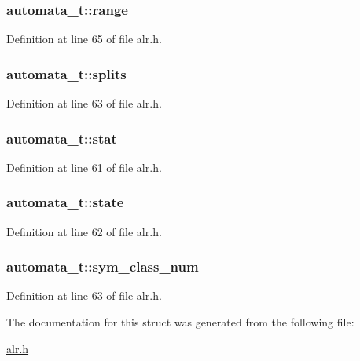 \hypertarget{structautomata__t_afcdd7f850b7d570e79cb82885fd973d1}{
\subsubsection[{range}]{ automata\-\_\-t\-::range}}\label{structautomata__t_afcdd7f850b7d570e79cb82885fd973d1}


Definition at line 65 of file alr.\-h.

\hypertarget{structautomata__t_a419b230963c5665dfe3b183ebf656708}{
\subsubsection[{splits}]{ automata\-\_\-t\-::splits}}\label{structautomata__t_a419b230963c5665dfe3b183ebf656708}


Definition at line 63 of file alr.\-h.

\hypertarget{structautomata__t_ab202220b21f1095ec7837e4c14b0e9ed}{
\subsubsection[{stat}]{ automata\-\_\-t\-::stat}}\label{structautomata__t_ab202220b21f1095ec7837e4c14b0e9ed}


Definition at line 61 of file alr.\-h.

\hypertarget{structautomata__t_a967887d248745296590c426dd1046cea}{
\subsubsection[{state}]{ automata\-\_\-t\-::state}}\label{structautomata__t_a967887d248745296590c426dd1046cea}


Definition at line 62 of file alr.\-h.

\hypertarget{structautomata__t_af7d9c374fd308653e15298ed62c36d59}{
\subsubsection[{sym\-\_\-class\-\_\-num}]{ automata\-\_\-t\-::sym\-\_\-class\-\_\-num}}\label{structautomata__t_af7d9c374fd308653e15298ed62c36d59}


Definition at line 63 of file alr.\-h.



The documentation for this struct was generated from the following file\-:\begin{DoxyCompactItemize}
\item 
\hyperlink{alr_8h}{alr.\-h}\end{DoxyCompactItemize}
